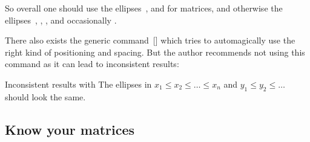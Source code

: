 
So overall one should use the ellipses~,  and  for matrices, and otherwise the ellipses~, , ,  and occasionally .

There also exists the generic command~[\comname] which tries to automagically use the right kind of positioning and spacing.
But the author recommends not using this command as it can lead to inconsistent results:
\begin{showlatex}{Inconsistent results with }
The ellipses in $x_1 \leq x_2 \leq \dots \leq x_n$ and $y_1 \leq y_2 \leq \dots$ should look the same.
\end{showlatex}




\subsection{Know your matrices}

